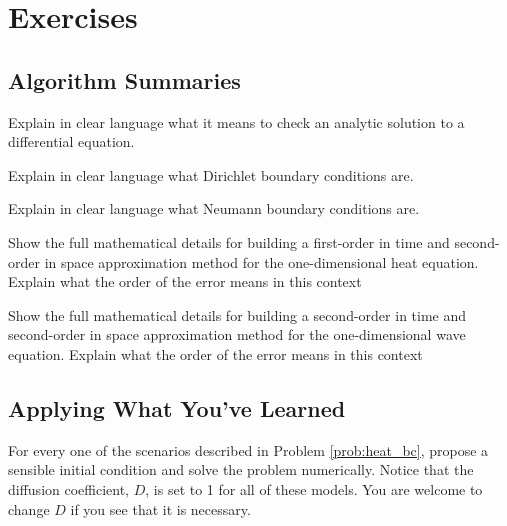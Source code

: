 \newpage\section{Exercises}

\subsection{Algorithm Summaries}

\begin{problem}
    Explain in clear language what it means to check an analytic solution to a
    differential equation.
\end{problem}

\begin{problem}
    Explain in clear language what Dirichlet boundary conditions are.
\end{problem}

\begin{problem}
    Explain in clear language what Neumann boundary conditions are.
\end{problem}

\begin{problem}
    Show the full mathematical details for building a first-order in time and
    second-order in space approximation method for the
    one-dimensional heat equation.  Explain what the order of the error means in this
    context
\end{problem}

\begin{problem}
    Show the full mathematical details for building a second-order in time and
    second-order in space approximation method for the
    one-dimensional wave equation.  Explain what the order of the error means in this
    context
\end{problem}


\subsection{Applying What You've Learned}

\begin{problem}
    For every one of the scenarios described in Problem \ref{prob:heat_bc}, propose a
    sensible initial condition and solve the problem numerically.  Notice that the
    diffusion coefficient, $D$, is set to 1 for all of these models.  You are welcome to
    change $D$ if you see that it is necessary.
\end{problem}


